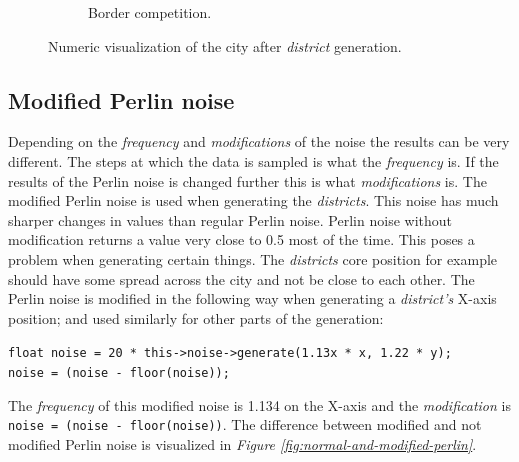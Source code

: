 \begin{figure}[h]
\begin{subfigure}{0.5\textwidth}
			\caption{Border competition.}
			\label{fig:map-borders}
		\end{subfigure}
		\caption{Numeric visualization of the city after \textit{district} generation.}
		\label{fig:map-districts-and-borders}
	\end{figure}
		
	\subsection{Modified Perlin noise}
	Depending on the \textit{frequency} and \textit{modifications} of the noise the results can be very different. The steps at which the data is sampled is what the \textit{frequency} is. If the results of the Perlin noise is changed further this is what \textit{modifications} is. The modified Perlin noise is used when generating the \textit{districts}. This noise has much sharper changes in values than regular Perlin noise. Perlin noise without modification returns a value very close to 0.5 most of the time. This poses a problem when generating certain things. The \textit{districts} core position for example should have some spread across the city and not be close to each other. The Perlin noise is modified in the following way when generating a \textit{district's} X-axis position; and used similarly for other parts of the generation:
		
	\texttt{float noise = 20 * this->noise->generate(1.13x * x, 1.22 * y);\\
		noise = (noise - floor(noise));}
		
	The \textit{frequency} of this modified noise is 1.134 on the X-axis and the \textit{modification} is \texttt{noise = (noise - floor(noise))}.
	The difference between modified and not modified Perlin noise is visualized in \textit{Figure \ref{fig:normal-and-modified-perlin}}.
		
